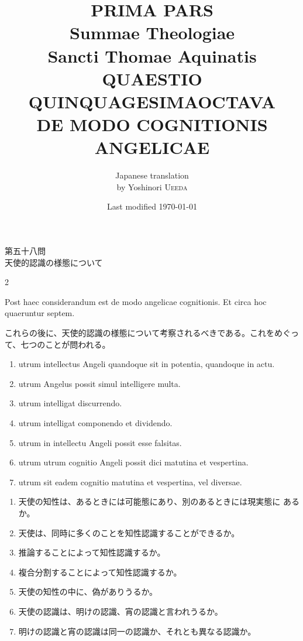 \documentclass[paper=a4paper,fontsize=10pt,jafontsize=9pt,titlepage]{jlreq}
\title{{\bfseries PRIMA PARS}\\{\Huge Summae Theologiae}\\Sancti Thomae
Aquinatis\\{\sffamily QUAESTIO QUINQUAGESIMAOCTAVA}\\DE MODO
COGNITIONIS ANGELICAE}
\author{Japanese translation\\by Yoshinori {\scshape Ueeda}}
\date{Last modified \today}
\begin{document}
\maketitle
\pagestyle{fancy}

\begin{center}
{\Large 第五十八問\\天使的認識の様態について}
\end{center}

\begin{paracol}{2}

Post haec considerandum est de modo angelicae cognitionis. Et circa
hoc quaeruntur septem.

\switchcolumn

これらの後に、天使的認識の様態について考察されるべきである。これをめぐっ
て、七つのことが問われる。

\switchcolumn*

\begin{enumerate}
 \item utrum intellectus Angeli quandoque sit in potentia, quandoque in actu.
 \item utrum Angelus possit simul intelligere multa.
 \item utrum intelligat discurrendo.
 \item utrum intelligat componendo et dividendo.
 \item utrum in intellectu Angeli possit esse falsitas.
 \item utrum utrum cognitio Angeli possit dici matutina et vespertina.
 \item utrum sit eadem cognitio matutina et vespertina, vel diversae.
\end{enumerate}

\switchcolumn

\begin{enumerate}
  \item 天使の知性は、あるときには可能態にあり、別のあるときには現実態に
	あるか。
  \item 天使は、同時に多くのことを知性認識することができるか。
  \item 推論することによって知性認識するか。
  \item 複合分割することによって知性認識するか。
  \item 天使の知性の中に、偽がありうるか。
  \item 天使の認識は、明けの認識、宵の認識と言われうるか。
  \item 明けの認識と宵の認識は同一の認識か、それとも異なる認識か。
 \end{enumerate}

\switchcolumn*

\end{paracol}
\end{document}
